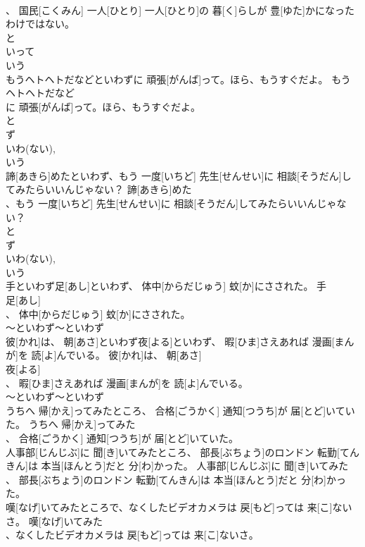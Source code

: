 \documentclass[8pt]{extreport}
\begin{document}
\begin{CJK}{UTF8}{min}
\\	、 国民[こくみん] 一人[ひとり] 一人[ひとり]の 暮[く]らしが 豊[ゆた]かになったわけではない。	
\\	と 
\\	いって 
\\	いう
\\	もうヘトヘトだなどといわずに 頑張[がんば]って。ほら、もうすぐだよ。	もうヘトヘトだなど
\\	に 頑張[がんば]って。ほら、もうすぐだよ。	
\\	と 
\\	ず 
\\	いわ(ない), 
\\	いう
\\	諦[あきら]めたといわず、もう 一度[いちど] 先生[せんせい]に 相談[そうだん]してみたらいいんじゃない？	諦[あきら]めた
\\	、もう 一度[いちど] 先生[せんせい]に 相談[そうだん]してみたらいいんじゃない？	
\\	と 
\\	ず 
\\	いわ(ない), 
\\	いう
\\	手といわず足[あし]といわず、 体中[からだじゅう] 蚊[か]にさされた。	手
\\	足[あし]
\\	、 体中[からだじゅう] 蚊[か]にさされた。	
\\	～といわず～といわず
\\	彼[かれ]は、 朝[あさ]といわず夜[よる]といわず、 暇[ひま]さえあれば 漫画[まんが]を 読[よ]んでいる。	彼[かれ]は、 朝[あさ]
\\	夜[よる]
\\	、 暇[ひま]さえあれば 漫画[まんが]を 読[よ]んでいる。	
\\	～といわず～といわず
\\	うちへ 帰[かえ]ってみたところ、 合格[ごうかく] 通知[つうち]が 届[とど]いていた。	うちへ 帰[かえ]ってみた
\\	、 合格[ごうかく] 通知[つうち]が 届[とど]いていた。	
\\	人事部[じんじぶ]に 聞[き]いてみたところ、 部長[ぶちょう]のロンドン 転勤[てんきん]は 本当[ほんとう]だと 分[わ]かった。	人事部[じんじぶ]に 聞[き]いてみた
\\	、 部長[ぶちょう]のロンドン 転勤[てんきん]は 本当[ほんとう]だと 分[わ]かった。	
\\	嘆[なげ]いてみたところで、なくしたビデオカメラは 戻[もど]っては 来[こ]ないさ。	嘆[なげ]いてみた
\\	、なくしたビデオカメラは 戻[もど]っては 来[こ]ないさ。	

\end{CJK}
\end{document}
